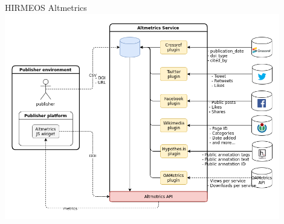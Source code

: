 \documentclass[xcolor=svgnames]{beamer}
\begin{document}
        \begin{frame}{HIRMEOS Altmetrics}
            \includegraphics[width=0.9\textwidth]{img/h5}
        \end{frame}
\end{document}
